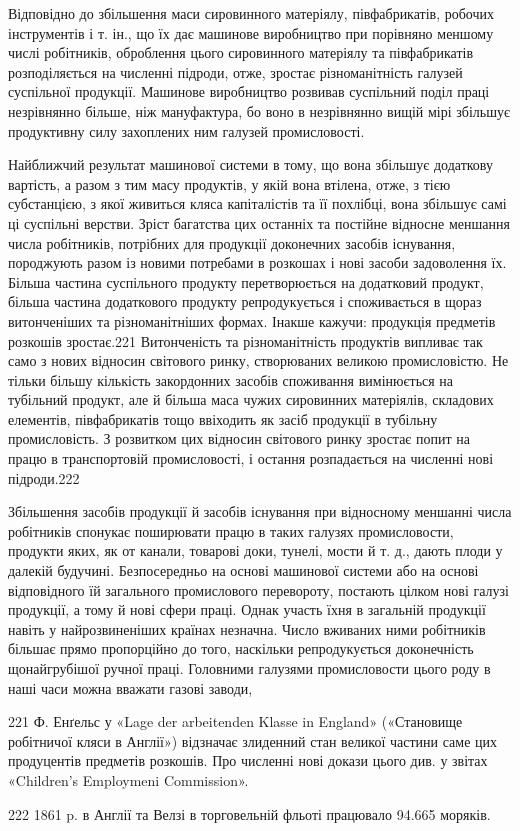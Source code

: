 Відповідно до збільшення маси сировинного матеріялу, півфабрикатів,
робочих інструментів і т. ін., що їх дає машинове
виробництво при порівняно меншому числі робітників,
оброблення цього сировинного матеріялу та півфабрикатів розподіляється
на численні підроди, отже, зростає різноманітність
галузей суспільної продукції. Машинове виробництво розвивав
суспільний поділ праці незрівнянно більше, ніж мануфактура,
бо воно в незрівнянно вищій мірі збільшує продуктивну силу
захоплених ним галузей промисловості.

Найближчий результат машинової системи в тому, що вона
збільшує додаткову вартість, а разом з тим масу продуктів, у
якій вона втілена, отже, з тією субстанцією, з якої живиться
кляса капіталістів та її похлібці, вона збільшує самі ці суспільні
верстви. Зріст багатства цих останніх та постійне відносне меншання
числа робітників, потрібних для продукції доконечних
засобів існування, породжують разом із новими потребами в розкошах
і нові засоби задоволення їх. Більша частина суспільного
продукту перетворюється на додатковий продукт, більша частина
додаткового продукту репродукується і споживається в щораз
витонченіших та різноманітніших формах. Інакше кажучи: продукція
предметів розкошів зростає.221 Витонченість та різноманітність
продуктів випливає так само з нових відносин світового
ринку, створюваних великою промисловістю. Не тільки
більшу кількість закордонних засобів споживання вимінюється
на тубільний продукт, але й більша маса чужих сировинних матеріялів,
складових елементів, півфабрикатів тощо ввіходить
як засіб продукції в тубільну промисловість. З розвитком цих
відносин світового ринку зростає попит на працю в транспортовій
промисловості, і остання розпадається на численні нові
підроди.222

Збільшення засобів продукції й засобів існування при відносному
меншанні числа робітників спонукає поширювати працю в
таких галузях промисловости, продукти яких, як от канали,
товарові доки, тунелі, мости й т. д., дають плоди у далекій будучині.
Безпосередньо на основі машинової системи або на основі
відповідного їй загального промислового перевороту, постають
цілком нові галузі продукції, а тому й нові сфери праці. Однак
участь їхня в загальній продукції навіть у найрозвиненіших
країнах незначна. Число вживаних ними робітників більшає
прямо пропорційно до того, наскільки репродукується доконечність
щонайгрубішої ручної праці. Головними галузями промисловости
цього роду в наші часи можна вважати газові заводи,

221 Ф. Енґельс у «Lage der arbeitenden Klasse in England» («Становище
робітничої кляси в Англії») відзначає злиденний стан великої частини
саме цих продуцентів предметів розкошів. Про численні нові докази
цього див. у звітах «Children’s Employmeni Commission».

222 1861 p. в Англії та Велзі в торговельній фльоті працювало 94.665
моряків.
